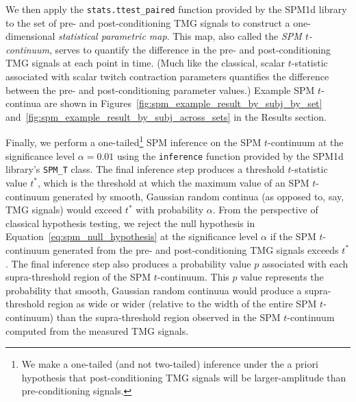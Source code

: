 \documentclass[utf8]{style/FrontiersinHarvard}
\begin{document}
We then apply the \texttt{stats.ttest\_paired} function provided by the SPM1d library to the set of pre- and post-conditioning TMG signals to construct a one-dimensional \textit{statistical parametric map}.
This map, also called the \textit{SPM $ t $-continuum}, serves to quantify the difference in the pre- and post-conditioning TMG signals at each point in time.
(Much like the classical, scalar $ t $-statistic associated with scalar twitch contraction parameters quantifies the difference between the pre- and post-conditioning parameter values.)
Example SPM $ t $-continua are shown in Figures~\ref{fig:spm_example_result_by_subj_by_set} and~\ref{fig:spm_example_result_by_subj_across_sets} in the Results section.

Finally, we perform a one-tailed\footnote{We make a one-tailed (and not two-tailed) inference under the a priori hypothesis that post-conditioning TMG signals will be larger-amplitude than pre-conditioning signals.} SPM inference on the SPM $ t $-continuum at the significance level $ \alpha = 0.01 $ using the \texttt{inference} function provided by the SPM1d library's \texttt{SPM\_T} class.
The final inference step produces a threshold $ t $-statistic value $ t^{*} $, which is the threshold at which the maximum value of an SPM $ t $-continuum generated by smooth, Gaussian random continua (as opposed to, say, TMG signals) would exceed $ t^{*} $ with probability $ \alpha $.
From the perspective of classical hypothesis testing, we reject the null hypothesis in Equation~\ref{eq:spm_null_hypothesis} at the significance level $ \alpha $ if the SPM $ t $-continuum generated from the pre- and post-conditioning TMG signals exceeds $ t^{*} $.
The final inference step also produces a probability value $ p $ associated with each supra-threshold region of the SPM $ t $-continuum.
This $ p $ value represents the probability that smooth, Gaussian random continuua would produce a supra-threshold region as wide or wider (relative to the width of the entire SPM $ t $-continuum) than the supra-threshold region observed in the SPM $ t $-continuum computed from the measured TMG signals.

\end{document}
